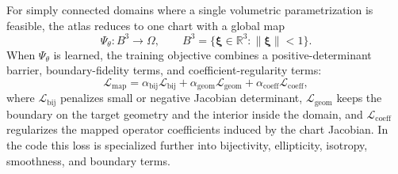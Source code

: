 \documentclass[sort&compress]{svjour3} %
\begin{document}
For simply connected domains where a single volumetric parametrization is feasible, the atlas reduces to one chart with a global map
\begin{equation}
\Psi_\theta:B^3\rightarrow \Omega,
\qquad
B^3=\{\boldsymbol{\xi}\in\mathbb{R}^3:\|\boldsymbol{\xi}\|<1\}.
\label{eq:global_map}
\end{equation}
When $\Psi_\theta$ is learned, the training objective combines a positive-determinant barrier, boundary-fidelity terms, and coefficient-regularity terms:
\begin{equation}
\mathcal{L}_{\mathrm{map}}
=
\alpha_{\mathrm{bij}}\mathcal{L}_{\mathrm{bij}}
+
\alpha_{\mathrm{geom}}\mathcal{L}_{\mathrm{geom}}
+
\alpha_{\mathrm{coeff}}\mathcal{L}_{\mathrm{coeff}},
\label{eq:global_map_loss}
\end{equation}
where $\mathcal{L}_{\mathrm{bij}}$ penalizes small or negative Jacobian determinant, $\mathcal{L}_{\mathrm{geom}}$ keeps the boundary on the target geometry and the interior inside the domain, and $\mathcal{L}_{\mathrm{coeff}}$ regularizes the mapped operator coefficients induced by the chart Jacobian. In the code this loss is specialized further into bijectivity, ellipticity, isotropy, smoothness, and boundary terms.
\end{document}
